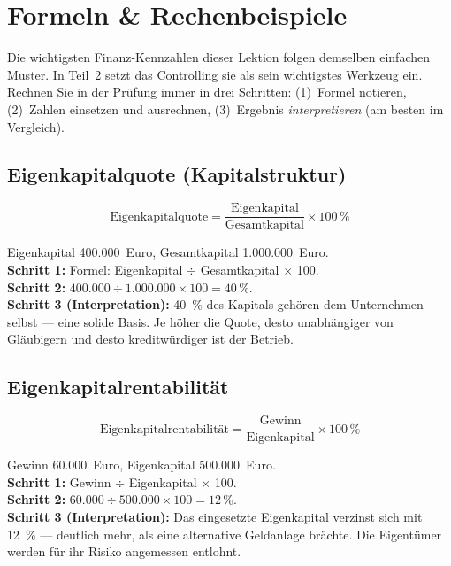 \documentclass[11pt, a4paper]{article}
\begin{document}
\section{Formeln \& Rechenbeispiele}\label{sec:formeln}

Die wichtigsten Finanz-Kennzahlen dieser Lektion folgen demselben einfachen Muster.
In Teil~2 setzt das Controlling sie als sein wichtigstes Werkzeug ein. Rechnen Sie in der
Prüfung immer in drei Schritten: (1)~Formel notieren, (2)~Zahlen einsetzen und
ausrechnen, (3)~Ergebnis \emph{interpretieren} (am besten im Vergleich).

\subsection{Eigenkapitalquote (Kapitalstruktur)}

\[
\mbox{Eigenkapitalquote} = \frac{\mbox{Eigenkapital}}{\mbox{Gesamtkapital}} \times 100\,\%
\]

\begin{beispiel}[title={Beispiel: Eigenkapitalquote}]
Eigenkapital 400.000~Euro, Gesamtkapital 1.000.000~Euro.\\
\textbf{Schritt 1:} Formel: Eigenkapital $\div$ Gesamtkapital $\times$ 100.\\
\textbf{Schritt 2:} $400.000 \div 1.000.000 \times 100 = 40\,\%$.\\
\textbf{Schritt 3 (Interpretation):} 40~\% des Kapitals gehören dem Unternehmen selbst
--- eine solide Basis. Je höher die Quote, desto unabhängiger von Gläubigern und desto
kreditwürdiger ist der Betrieb.
\end{beispiel}

\subsection{Eigenkapitalrentabilität}

\[
\mbox{Eigenkapitalrentabilität} = \frac{\mbox{Gewinn}}{\mbox{Eigenkapital}} \times 100\,\%
\]

\begin{beispiel}[title={Beispiel: Eigenkapitalrentabilität}]
Gewinn 60.000~Euro, Eigenkapital 500.000~Euro.\\
\textbf{Schritt 1:} Gewinn $\div$ Eigenkapital $\times$ 100.\\
\textbf{Schritt 2:} $60.000 \div 500.000 \times 100 = 12\,\%$.\\
\textbf{Schritt 3 (Interpretation):} Das eingesetzte Eigenkapital verzinst sich mit
12~\% --- deutlich mehr, als eine alternative Geldanlage brächte. Die Eigentümer werden
für ihr Risiko angemessen entlohnt.
\end{beispiel}
\end{document}
